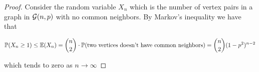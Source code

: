 \begin{proof}
Consider the random variable $X_{n}$ which is the number of vertex pairs in a graph in $\mathcal{G}(n,p)$ with no common neighbors. By Markov's inequality we have that

$$\mathbb{P}(X_{n} \geq 1)\leq \mathbb{E}(X_{n}) = \binom{n}{2} \cdot \mathbb{P}(\text{two vertices doesn't have common neighbors}) = \binom{n}{2} (1-p^{2})^{n-2}$$

which tends to zero as $n\to \infty$
\end{proof}





